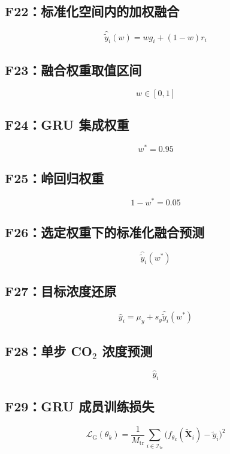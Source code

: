 \documentclass[UTF8,a4paper,11pt]{ctexart}
\begin{document}
\subsection*{F22：标准化空间内的加权融合}
\[
\widehat{\widetilde{y}}_i(w)=w g_i+(1-w)r_i
\]

\subsection*{F23：融合权重取值区间}
\[
w\in[0,1]
\]

\subsection*{F24：GRU 集成权重}
\[
w^*=0.95
\]

\subsection*{F25：岭回归权重}
\[
1-w^*=0.05
\]

\subsection*{F26：选定权重下的标准化融合预测}
\[
\widehat{\widetilde{y}}_i(w^*)
\]

\subsection*{F27：目标浓度还原}
\[
\widehat{y}_i=\mu_y+s_y\widehat{\widetilde{y}}_i(w^*)
\]

\subsection*{F28：单步 CO$_2$ 浓度预测}
\[
\widehat{y}_i
\]

\subsection*{F29：GRU 成员训练损失}
\[
\mathcal{L}_{\mathrm{G}}(\theta_k)= \frac{1}{M_{\mathrm{tr}}} \sum_{i\in\mathcal{I}_{\mathrm{tr}}} \bigl(f_{\theta_k}(\widetilde{\mathbf{X}}_i)-\widetilde{y}_i\bigr)^2
\]
\end{document}
